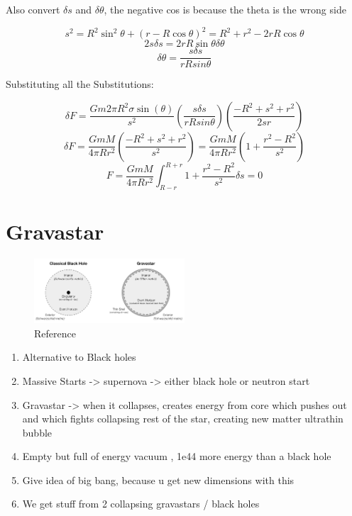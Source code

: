 \documentclass{article}
\begin{document}
Also convert $\delta s$ and $\delta \theta$, the negative cos is because the theta is the wrong side

$$s^2 = R^2\sin^2\theta + (r - R\cos\theta)^2 = R^2 + r^2 - 2rR\cos\theta$$
$$2s\delta s = 2rR \sin \theta \delta \theta $$
$$\delta \theta = \frac{s \delta s}{rRsin\theta}$$

Substituting all the Substitutions:

$$\delta F = \frac{G m 2 \pi R^2 \sigma  \sin(\theta) }{s^2}\left(\frac{s \delta s}{rRsin\theta}\right) \left(\frac{-R^2 + s^2 + r^2}{2sr}\right)$$
$$\delta F = \frac{G m M}{4 \pi R r^2} \left(\frac{- R^2 + s^2 + r^2}{s^2}\right) = \frac{G m M}{4 \pi R r^2} \left( 1 + \frac{ r^2 - R^2}{s^2}\right) $$
$$F = \frac{G m M}{4 \pi R r^2} \int_{R-r}^{R+r} 1 + \frac{r^2 - R^2}{s^2} \delta s = 0$$

\section{Gravastar}


\begin{figure}[H]
    \centering
    \includegraphics[width=0.5\textwidth]{figures/Gravastar.png}
    \caption{Reference}
\end{figure}

\begin{enumerate}
    \item Alternative to Black holes
    \item Massive Starts -> supernova -> either black hole or neutron start 
    \item Gravastar -> when it collapses, creates energy from core which pushes out and which fights collapsing rest of the star, creating new matter ultrathin bubble
    \item Empty but full of energy vacuum , 1e44 more energy than a black hole
    \item Give idea of big bang, because u get new dimensions with this
    \item We get stuff from 2 collapsing gravastars / black holes
\end{enumerate}
\end{document}
